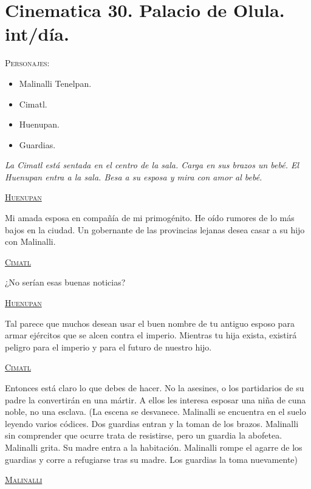 \documentclass[11pt,letterpaper]{article}
\begin{document}
\section{Cinematica 30. Palacio de Olula. int/día. }
 \textsc{Personajes}:
 \begin{itemize}
 \item Malinalli Tenelpan.
\item Cimatl.
\item Huenupan.
\item Guardias.
 \end{itemize}
\textit{La Cimatl está sentada en el centro de la sala. Carga en sus brazos un bebé. El Huenupan entra a la sala. Besa a su esposa y mira con amor al bebé.}
\begin{center}
\textsc{\underline{Huenupan}}
\\
\par
Mi amada esposa en compañía de mi primogénito. He oído rumores de lo más bajos en la ciudad. Un gobernante de las provincias lejanas desea casar a su hijo con Malinalli.
\\
\par
\textsc{\underline{Cimatl}}
\\
\par
¿No serían esas buenas noticias?
\\
\par
\textsc{\underline{Huenupan}}
\\
\par
Tal parece que muchos desean usar el buen nombre de tu antiguo esposo para armar ejércitos que se alcen contra el imperio. Mientras tu hija exista, existirá peligro para el imperio y para el futuro de nuestro hijo.
\\
\par
\textsc{\underline{Cimatl}}
\\
\par
Entonces está claro lo que debes de hacer. No la asesines, o los partidarios de su padre la convertirán en una mártir. A ellos les interesa esposar una niña de cuna noble, no una esclava. 
(La escena se desvanece. Malinalli se encuentra en el suelo leyendo varios códices. Dos guardias entran y la toman de los brazos. Malinalli sin comprender que ocurre trata de resistirse, pero un guardia la abofetea. Malinalli grita. Su madre entra a la habitación. Malinalli rompe el agarre de los guardias y corre a refugiarse tras su madre. Los guardias la toma nuevamente)
\\
\par
\textsc{\underline{Malinalli}}

\end{center}
\end{document}
